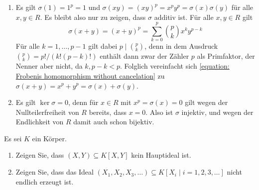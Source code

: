 \begin{solution}
  \begin{enumerate}
    \item
      Es gilt $\sigma(1) = 1^p = 1$ und $\sigma(xy) = (xy)^p = x^p y^p = \sigma(x) \sigma(y)$ für alle $x, y \in R$.
      Es bleibt also nur zu zeigen, dass $\sigma$ additiv ist.
      Für alle $x, y \in R$ gilt
      \begin{equation}
        \label{equation: Frobenis homomorphism without cancelation}
        \sigma(x+y) = (x+y)^p = \sum_{k=0}^p \binom{p}{k} x^k y^{p-k}
      \end{equation}
      Für alle $k = 1, \dotsc, p-1$ gilt dabei $p \mid \binom{p}{k}$, denn in dem Ausdruck $\binom{p}{k} = p!/(k!(p-k)!)$ enthält dann zwar der Zähler $p$ als Primfaktor, der Nenner aber nicht, da $k, p-k < p$.
      Folglich vereinfacht sich \eqref{equation: Frobenis homomorphism without cancelation} zu $\sigma(x+y) = x^p + y^p = \sigma(x) + \sigma(y)$.
    \item
      Es gilt $\ker \sigma = 0$, denn für $x \in R$ mit $x^p = \sigma(x) = 0$ gilt wegen der Nullteilerfreiheit von $R$ bereits, dass $x = 0$.
      Also ist $\sigma$ injektiv, und wegen der Endlichkeit von $R$ damit auch schon bijektiv.
  \end{enumerate}
\end{solution}


\begin{question}
  \label{question: examples for non principal and not finitely generated modules}
  Es sei $K$ ein Körper.
  \begin{enumerate}
    \item
      Zeigen Sie, dass $(X,Y) \subseteq K[X,Y]$ kein Hauptideal ist.
    \item
      Zeigen Sie, dass das Ideal $(X_1, X_2, X_3, \dotsc) \subseteq K[X_i \mid i = 1, 2, 3, \dotsc]$ nicht endlich erzeugt ist.
  \end{enumerate}
\end{question}


